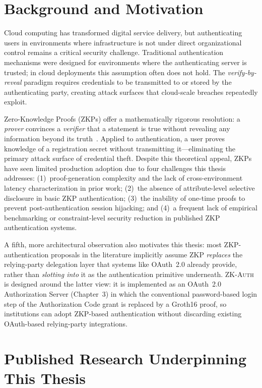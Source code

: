 \documentclass[12pt,a4paper,oneside]{report}
\begin{document}
\section{Background and Motivation}

Cloud computing has transformed digital service delivery, but authenticating
users in environments where infrastructure is not under direct organizational
control remains a critical security challenge. Traditional authentication
mechanisms were designed for environments where the authenticating server is
trusted; in cloud deployments this assumption often does not hold. The
\textit{verify-by-reveal} paradigm requires credentials to be transmitted to
or stored by the authenticating party, creating attack surfaces that
cloud-scale breaches repeatedly exploit.

Zero-Knowledge Proofs (ZKPs) offer a mathematically rigorous resolution: a
\textit{prover} convinces a \textit{verifier} that a statement is true
without revealing any information beyond its truth~\cite{gmr89}. Applied to
authentication, a user proves knowledge of a registration secret without
transmitting it---eliminating the primary attack surface of credential
theft. Despite this theoretical appeal, ZKPs have seen limited production
adoption due to four challenges this thesis addresses: (1)~proof-generation
complexity and the lack of cross-environment latency characterization in
prior work; (2)~the absence of attribute-level selective disclosure in
basic ZKP authentication; (3)~the inability of one-time proofs to prevent
post-authentication session hijacking; and (4)~a frequent lack of empirical
benchmarking or constraint-level security reduction in published ZKP
authentication systems.

A fifth, more architectural observation also motivates this thesis: most
ZKP-authentication proposals in the literature implicitly assume ZKP
\textit{replaces} the relying-party delegation layer that systems like
OAuth~2.0 already provide, rather than \textit{slotting into} it as the
authentication primitive underneath. \textsc{ZK-Auth} is designed around
the latter view: it is implemented as an OAuth~2.0 Authorization Server
(Chapter~3) in which the conventional password-based login step of the
Authorization Code grant is replaced by a Groth16 proof, so institutions
can adopt ZKP-based authentication without discarding existing
OAuth-based relying-party integrations.

\section{Published Research Underpinning This Thesis}
\end{document}
